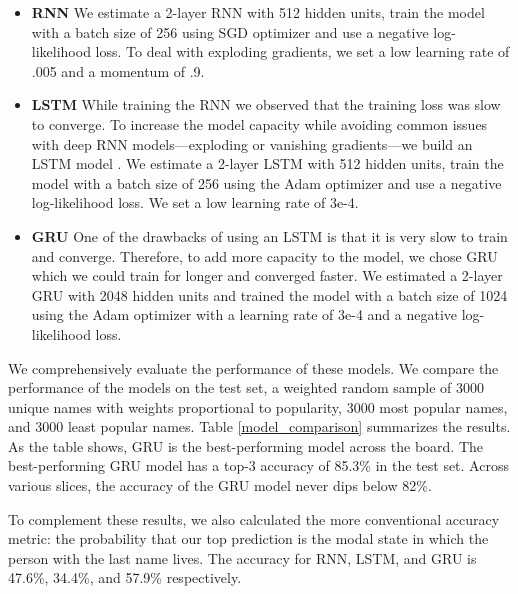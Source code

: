\documentclass[11pt,  letterpaper]{article}
\begin{document}
\begin{itemize}

    \item \textbf{RNN} We estimate a 2-layer RNN \citep{10.1145/3426826.3426842, 8469258} with 512 hidden units, train the model with a batch size of 256 using SGD optimizer and use a negative log-likelihood loss. To deal with exploding gradients, we set a low learning rate of .005 and a momentum of .9.

    \item \textbf{LSTM} While training the RNN we observed that the training loss was slow to converge. To increase the model capacity while avoiding common issues with deep RNN models---exploding or vanishing gradients---we build an LSTM model \citep{hochreiter1997long}. We estimate a 2-layer LSTM with 512 hidden units, train the model with a batch size of 256 using the Adam optimizer and use a negative log-likelihood loss. We set a low learning rate of 3e-4. 

    \item \textbf{GRU} One of the drawbacks of using an LSTM is that it is very slow to train and converge. Therefore, to add more capacity to the model, we chose GRU which we could train for longer and converged faster. We estimated a 2-layer GRU \citep{cho2014properties} with 2048 hidden units and trained the model with a batch size of 1024 using the Adam optimizer with a learning rate of 3e-4 and a negative log-likelihood loss. 

\end{itemize}

We comprehensively evaluate the performance of these models. We compare the performance of the models on the test set, a weighted random sample of 3000 unique names with weights proportional to popularity, 3000 most popular names, and 3000 least popular names. Table \ref{model_comparison} summarizes the results. As the table shows, GRU is the best-performing model across the board. The best-performing GRU model has a top-3 accuracy of 85.3\% in the test set. Across various slices, the accuracy of the GRU model never dips below 82\%. 

To complement these results, we also calculated the more conventional accuracy metric: the probability that our top prediction is the modal state in which the person with the last name lives. The accuracy for RNN, LSTM, and GRU is 47.6\%, 34.4\%, and 57.9\% respectively.


\end{document}
